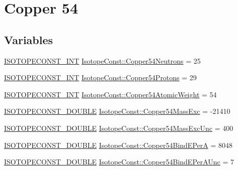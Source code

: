 \hypertarget{group___isotope_const-_copper-_cu54}{}\section{Copper 54}
\label{group___isotope_const-_copper-_cu54}
\subsection*{Variables}
\begin{DoxyCompactItemize}
\item 
\mbox{\hyperlink{group___isotope_const-_macros_ga5f18360b3e99483a35c32d789e62621c}{I\+S\+O\+T\+O\+P\+E\+C\+O\+N\+S\+T\+\_\+\+I\+NT}} \mbox{\hyperlink{group___isotope_const-_copper-_cu54_gaee177a75e6652cb4249ed9891ad79083}{Isotope\+Const\+::\+Copper54\+Neutrons}} = 25
\item 
\mbox{\hyperlink{group___isotope_const-_macros_ga5f18360b3e99483a35c32d789e62621c}{I\+S\+O\+T\+O\+P\+E\+C\+O\+N\+S\+T\+\_\+\+I\+NT}} \mbox{\hyperlink{group___isotope_const-_copper-_cu54_gad678c49c90d0f972748ee804bf797e03}{Isotope\+Const\+::\+Copper54\+Protons}} = 29
\item 
\mbox{\hyperlink{group___isotope_const-_macros_ga5f18360b3e99483a35c32d789e62621c}{I\+S\+O\+T\+O\+P\+E\+C\+O\+N\+S\+T\+\_\+\+I\+NT}} \mbox{\hyperlink{group___isotope_const-_copper-_cu54_ga7bad7820a3dd78fd0e4e69fd4ae829d2}{Isotope\+Const\+::\+Copper54\+Atomic\+Weight}} = 54
\item 
\mbox{\hyperlink{group___isotope_const-_macros_ga8f45a7272ce02c0b4c65c44636ed719a}{I\+S\+O\+T\+O\+P\+E\+C\+O\+N\+S\+T\+\_\+\+D\+O\+U\+B\+LE}} \mbox{\hyperlink{group___isotope_const-_copper-_cu54_ga140792571e6d6bc8535be39a7dc74fe3}{Isotope\+Const\+::\+Copper54\+Mass\+Exc}} = -\/21410
\item 
\mbox{\hyperlink{group___isotope_const-_macros_ga8f45a7272ce02c0b4c65c44636ed719a}{I\+S\+O\+T\+O\+P\+E\+C\+O\+N\+S\+T\+\_\+\+D\+O\+U\+B\+LE}} \mbox{\hyperlink{group___isotope_const-_copper-_cu54_ga4e6b4e4aa80ed338405fd71c1eb7d6f9}{Isotope\+Const\+::\+Copper54\+Mass\+Exc\+Unc}} = 400
\item 
\mbox{\hyperlink{group___isotope_const-_macros_ga8f45a7272ce02c0b4c65c44636ed719a}{I\+S\+O\+T\+O\+P\+E\+C\+O\+N\+S\+T\+\_\+\+D\+O\+U\+B\+LE}} \mbox{\hyperlink{group___isotope_const-_copper-_cu54_ga8d4bde1a57bc555d76df8e80e1d17199}{Isotope\+Const\+::\+Copper54\+Bind\+E\+PerA}} = 8048
\item 
\mbox{\hyperlink{group___isotope_const-_macros_ga8f45a7272ce02c0b4c65c44636ed719a}{I\+S\+O\+T\+O\+P\+E\+C\+O\+N\+S\+T\+\_\+\+D\+O\+U\+B\+LE}} \mbox{\hyperlink{group___isotope_const-_copper-_cu54_ga6581968718e0ce2728f38b586884266a}{Isotope\+Const\+::\+Copper54\+Bind\+E\+Per\+A\+Unc}} = 7

\end{DoxyCompactItemize}
